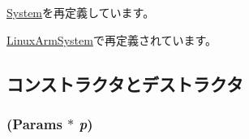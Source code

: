 \hyperlink{classSystem_a5f461be6222ce76bffcb70f27d820c56}{System}を再定義しています。

\hyperlink{classLinuxArmSystem_ae0ebf28024a7bb607cc65e59c8faa9d5}{LinuxArmSystem}で再定義されています。

\subsection{コンストラクタとデストラクタ}
\hypertarget{classArmSystem_a770423e6e1a1f3470611eeebb5499e52}{
\subsubsection[{ArmSystem}]{ ({\bf Params} $\ast$ {\em p})}}
\label{classArmSystem_a770423e6e1a1f3470611eeebb5499e52}



